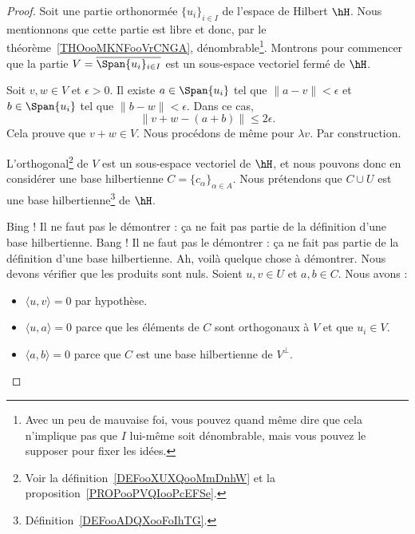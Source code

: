 \begin{proof}
	Soit une partie orthonormée \( \{ u_i \}_{i\in I}\) de l'espace de Hilbert \( \hH\). Nous mentionnons que cette partie est libre et donc, par le théorème~\ref{THOooMKNFooVrCNGA}, dénombrable\footnote{Avec un peu de mauvaise foi, vous pouvez quand même dire que cela n'implique pas que \( I\) lui-même soit dénombrable, mais vous pouvez le supposer pour fixer les idées.}.  Montrons pour commencer que la partie \( V=\overline{\Span\{ u_i \}_{i\in I}}\) est un sous-espace vectoriel fermé de \( \hH\).
	\begin{subproof}
		\spitem[Vectoriel] Soit \( v,w\in V\) et \( \epsilon>0\). Il existe \( a\in \Span\{ u_i \}\) tel que \( \| a-v \|<\epsilon\) et \( b\in \Span\{ u_i \}\) tel que \( \| b-w \|<\epsilon\). Dans ce cas,
		\begin{equation}
			\| v+w-(a+b) \|\leq 2\epsilon.
		\end{equation}
		Cela prouve que \( v+w\in V\). Nous procédons de même pour \( \lambda v\).
		\spitem[Fermé] Par construction.
	\end{subproof}

	L'orthogonal\footnote{Voir la définition~\ref{DEFooXUXQooMmDnhW} et la proposition~\ref{PROPooPVQIooPcEFSe}.} de \( V\) est un sous-espace vectoriel de \( \hH\), et nous pouvons donc en considérer une base hilbertienne \( C=\{ c_{\alpha} \}_{\alpha\in A}\). Nous prétendons que \( C\cup U\) est une base hilbertienne\footnote{Définition~\ref{DEFooADQXooFoIhTG}.} de \( \hH\).
	\begin{subproof}
		Bing ! Il ne faut pas le démontrer : ça ne fait pas partie de la définition d'une base hilbertienne.
		Bang ! Il ne faut pas le démontrer : ça ne fait pas partie de la définition d'une base hilbertienne.
		Ah, voilà quelque chose à démontrer. Nous devons vérifier que les produits sont nuls. Soient \( u,v\in U\) et \( a,b\in C\). Nous avons :
		\begin{itemize}
			\item \( \langle u, v\rangle =0\) par hypothèse.
			\item \( \langle u, a\rangle =0\) parce que les éléments de \( C\) sont orthogonaux à \( V\) et que \( u_i\in V\).
			\item \( \langle a, b\rangle =0\) parce que \( C\) est une base hilbertienne de \( V^{\perp}\).
		\end{itemize}


\end{subproof}
\end{proof}
